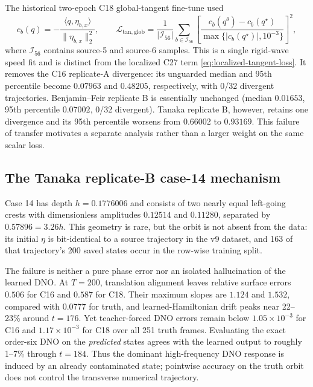 The historical two-epoch C18 global-tangent fine-tune used
\begin{equation}
  c_b(q)=-\frac{\langle q,\eta_{b,x}\rangle}{\|\eta_{b,x}\|_2^2},
  \qquad
  \mathcal L_{\mathrm{tan,glob}}
  =\frac1{|\mathcal I_{56}|}\sum_{b\in\mathcal I_{56}}
  \left[
  \frac{c_b(q^\theta)-c_b(q^\star)}
       {\max\{|c_b(q^\star)|,10^{-3}\}}
  \right]^2,
  \label{eq:c18-global-tangent}
\end{equation}
where $\mathcal I_{56}$ contains source-5 and source-6 samples. This is a
single rigid-wave speed fit and is distinct from the localized C27 term
\eqref{eq:localized-tangent-loss}. It removes the C16 replicate-A divergence: its
unguarded median and 95th percentile become $0.07963$ and
$0.48205$, respectively, with 0/32 divergent trajectories. Benjamin--Feir
replicate B
is essentially unchanged (median $0.01653$, 95th percentile $0.07002$, 0/32
divergent). Tanaka replicate B, however, retains one divergence and its 95th percentile
worsens from $0.66002$ to $0.93169$. This failure of transfer motivates a
separate analysis rather than a larger weight on the same scalar loss.

\subsection{The Tanaka replicate-B case-14 mechanism}
\label{sec:case14-diagnosis}

Case 14 has depth $h=0.1776006$ and consists of two nearly equal left-going
crests with dimensionless amplitudes $0.12514$ and $0.11280$, separated by
$0.57896=3.26h$. This geometry is rare, but the orbit is not absent from the
data: its initial $\eta$ is bit-identical to a source trajectory in the v9
dataset, and 163 of that trajectory's 200 saved states occur in the row-wise
training split.

The failure is neither a pure phase error nor an isolated hallucination of the
learned DNO\@. At $T=200$, translation alignment leaves relative surface errors
$0.506$ for C16 and $0.587$ for C18. Their maximum slopes are $1.124$ and
$1.532$, compared with $0.0777$ for truth, and learned-Hamiltonian drift peaks
near 22--23\% around $t=176$. Yet teacher-forced DNO errors remain below
$1.05\times10^{-3}$ for C16 and $1.17\times10^{-3}$ for C18 over all 251
truth frames. Evaluating the exact order-six DNO on the \emph{predicted}
states agrees with the learned output to roughly 1--7\% through $t=184$.
Thus the dominant high-frequency DNO response is induced by an already
contaminated state; pointwise accuracy on the truth orbit does not control the
transverse numerical trajectory.

